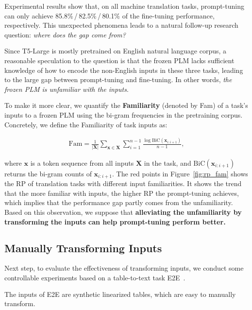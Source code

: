 Experimental results show that, on all machine translation tasks, prompt-tuning can only achieve 85.8\%\,/\,82.5\%\,/\,80.1\% of the fine-tuning performance, respectively. This unexpected phenomena leads to a natural follow-up research question: \emph{where does the gap come from?}

Since T5-Large is mostly pretrained on English natural language corpus, a reasonable speculation to the question is that the frozen PLM lacks sufficient knowledge of how to encode the non-English inputs in these three tasks, leading to the large gap between prompt-tuning and fine-tuning. In other words, \emph{the frozen PLM is unfamiliar with the inputs}.

To make it more clear, we quantify the \textbf{Familiarity} (denoted by Fam) of a task's inputs to a frozen PLM using the bi-gram frequencies in the pretraining corpus. Concretely, we define the Familiarity of task inputs as:

\begin{equation}
\begin{split}
    \mathrm{Fam} = \frac{1}{|\mathbf{X}|}\sum_{\mathbf{x}\in{\mathbf{X}}}  \sum_{i=1}^{n-1} \frac{\log{\mathrm{BiC}(\mathbf{x}_{i:i+1})}}{n-1},
\end{split}
\end{equation}

where $\mathbf{x}$ is a token sequence from all inputs $\mathbf{X}$ in the task, and $\mathrm{BiC}(\mathbf{x}_{i:i+1})$ returns the bi-gram counts of $\mathbf{x}_{i:i+1}$.
The \textcolor[rgb]{0.9,0,0}{red} points in Figure~\ref{fig:rp_fam} shows the RP of translation tasks with different input familiarities. It shows the trend that the more familiar with inputs, the higher RP the prompt-tuning achieves, which implies that the performance gap partly comes from the unfamiliarity. Based on this observation, we suppose that \textbf{alleviating the unfamiliarity by transforming the inputs can help prompt-tuning perform better.}

\subsection{Manually Transforming Inputs}
\label{section:control}

Next step, to evaluate the effectiveness of transforming inputs, we conduct some controllable experiments based on a table-to-text task E2E~\cite{novikova2017e2e}.

The inputs of E2E are synthetic linearized tables, which are easy to manually transform.

